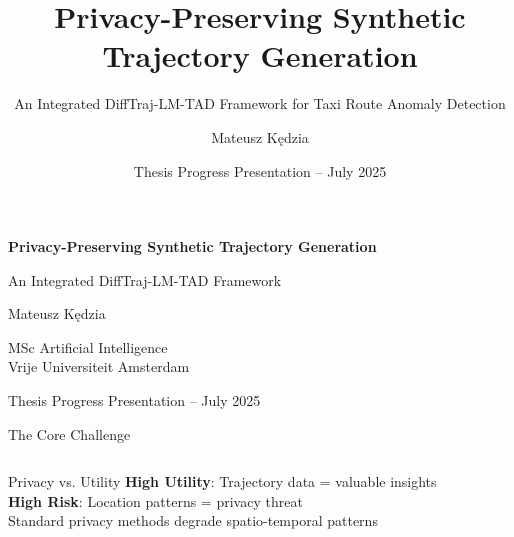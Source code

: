 \documentclass[aspectratio=169,xcolor={dvipsnames}]{beamer}
\title{Privacy-Preserving Synthetic Trajectory Generation}
\subtitle{An Integrated DiffTraj-LM-TAD Framework for Taxi Route Anomaly Detection}
\author{Mateusz Kędzia}
\institute{MSc Artificial Intelligence \\ Vrije Universiteit Amsterdam}
\date{Thesis Progress Presentation -- July 2025}
\newcommand{\highlight}[1]{\textcolor{RustyNail}{\textbf{#1}}}
\begin{document}
\begin{frame}[plain]
  \vspace{1.5cm}
  \centering
  {\color{VUBlue}\Huge\textbf{Privacy-Preserving Synthetic Trajectory Generation}}
  
  \vspace{0.5em}
  {\color{RichGold}\Large An Integrated DiffTraj-LM-TAD Framework}
  
  \vspace{1.5em}
  {\large Mateusz Kędzia}
  
  \vspace{0.5em}
  {\normalsize MSc Artificial Intelligence \\ Vrije Universiteit Amsterdam}
  
  \vspace{1em}
  {\small Thesis Progress Presentation -- July 2025}
\end{frame}

\begin{frame}{The Core Challenge}
  \begin{columns}[T,onlytextwidth]
    \begin{column}{0.6\textwidth}
      \begin{alertblock}{Privacy vs. Utility}
        \vspace{0.5em}
        \highlight{High Utility}: Trajectory data = valuable insights \\
        \highlight{High Risk}: Location patterns = privacy threat \\
        \vspace{0.5em}
        \textcolor{Charcoal}{\small Standard privacy methods degrade spatio-temporal patterns}
      \end{alertblock}
    \end{column}
    \begin{column}{0.4\textwidth}
      \centering
    \end{column}
  \end{columns}
\end{frame}
\end{document}
